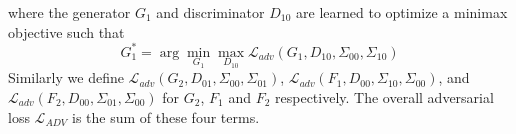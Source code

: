 \documentclass[10pt,twocolumn,letterpaper]{article}
\begin{document}
where the generator $G_1$ and discriminator $D_{10}$ are learned to optimize a minimax objective such that
\begin{equation}
G_1^*=\arg\min_{G_1}\max_{D_{10}}\mathcal{L}_{adv}(G_1,D_{10},\Sigma_{00},\Sigma_{10})
\end{equation}
Similarly we define $\mathcal{L}_{adv}(G_2,D_{01},\Sigma_{00},\Sigma_{01})$, $\mathcal{L}_{adv}(F_1,D_{00},\Sigma_{10},\Sigma_{00})$, and $\mathcal{L}_{adv}(F_2,D_{00},\Sigma_{01},\Sigma_{00})$ for $G_2$, $F_1$ and $F_2$ respectively. The overall adversarial loss $\mathcal{L}_{ADV}$ is the sum of these four terms.


\end{document}
